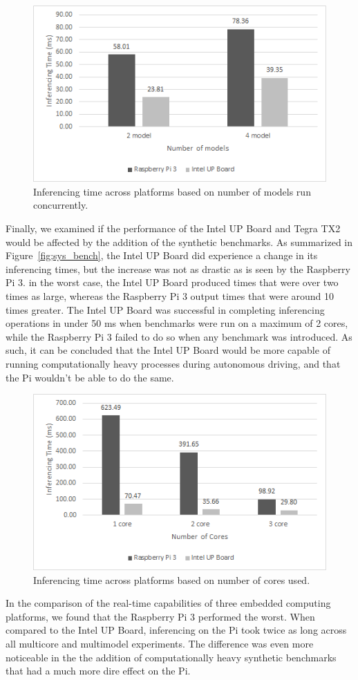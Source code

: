 \begin{figure}[h]
  \centering
  \includegraphics[width=.5\textwidth]{figs/system_multimodel}
  \caption{Inferencing time across platforms based on number of models run concurrently.}
  \label{fig:sys_model}
\end{figure}

Finally, we examined if the performance of the Intel UP Board and Tegra TX2 would be affected by the 
addition of the synthetic benchmarks. As summarized in Figure~\ref{fig;sys_bench}, the Intel UP Board 
did experience a change in its inferencing times, but the increase was not as drastic as is seen by 
the Raspberry Pi 3. in the worst case, the Intel UP Board produced times that were over two times as 
large, whereas the Raspberry Pi 3 output times that were around 10 times greater. The Intel UP Board 
was successful in completing inferencing operations in under 50 ms when benchmarks were run on a 
maximum of 2 cores, while the Raspberry Pi 3 failed to do so when any benchmark was introduced. As 
such, it can be concluded that the Intel UP Board would be more capable of running computationally 
heavy processes during autonomous driving, and that the Pi wouldn't be able to do the same.

\begin{figure}[h]
  \centering
  \includegraphics[width=.5\textwidth]{figs/system_benchmark}
  \caption{Inferencing time across platforms based on number of cores used.}
  \label{fig:sys_bench}
\end{figure} 

In the comparison of the real-time capabilities of three embedded computing platforms, we found that 
the Raspberry Pi 3 performed the worst. When compared to the Intel UP Board, inferencing on the Pi 
took twice as long across all multicore and multimodel experiments. The difference was even more 
noticeable in the the addition of computationally heavy synthetic benchmarks that had a much more 
dire effect on the Pi.



